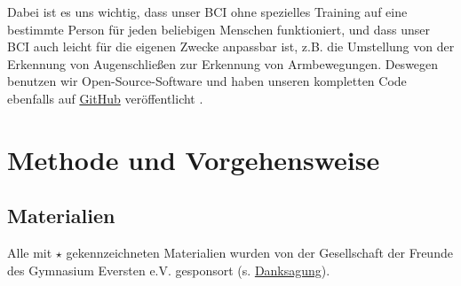 \documentclass[11pt]{scrartcl}
\begin{document}
	Dabei ist es uns wichtig, dass unser BCI ohne spezielles Training auf eine bestimmte Person für jeden beliebigen Menschen funktioniert, und dass unser BCI auch leicht für die eigenen Zwecke anpassbar ist, z.B. die Umstellung von der Erkennung von Augenschließen zur Erkennung von Armbewegungen. Deswegen benutzen wir Open-Source-Soft­ware und haben unseren kompletten Code ebenfalls auf \href{https://github.com/AR102/Interpreting-EEG-with-AI}{GitHub} veröffentlicht \cite{InterpretingEEG}.

	\section{Methode und Vorgehensweise}

	\subsection{Materialien} \label{Materialien}

	Alle mit $\star$ gekennzeichneten Materialien wurden von der Gesellschaft der Freunde des Gymnasium Eversten e.V. gesponsort  (s. \hyperref[Foerderverein]{Danksagung}).
\end{document}
